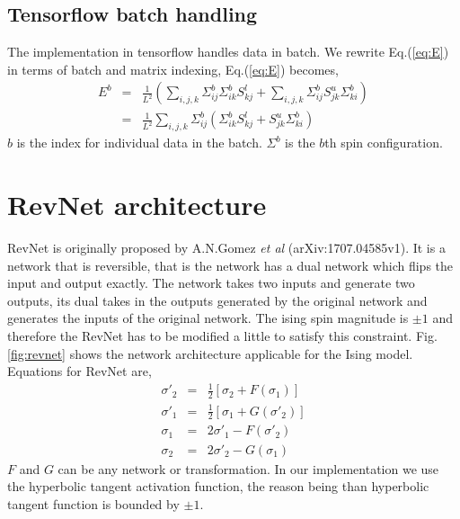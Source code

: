\documentclass{article}
\begin{document}
\subsection{Tensorflow batch handling}
The implementation in tensorflow handles data in batch. We rewrite 
Eq.(\ref{eq:E}) in terms
of batch and matrix indexing, Eq.(\ref{eq:E}) becomes,
\begin{eqnarray} \nonumber
E^b & = & \frac{1}{L^2} \left( 
             \sum_{i,j,k} \Sigma^b_{ij} \Sigma^b_{ik} S^l_{kj} +
             \sum_{i,j,k} \Sigma^b_{ij} S^u_{jk} \Sigma^b_{ki} 
          \right) \\
    & = & \frac{1}{L^2} \sum_{i,j,k} \Sigma^b_{ij}\left( 
              \Sigma^b_{ik} S^l_{kj} + S^u_{jk} \Sigma^b_{ki} 
          \right) 
\end{eqnarray}
$b$ is the index for individual data in the batch. $\Sigma^b$ is the $b$th
spin configuration.

\section{RevNet architecture}
RevNet is originally proposed by A.N.Gomez {\it et al} (arXiv:1707.04585v1).
It is a network that is reversible, that is the network has a dual network
which flips the input and output exactly. The network takes two inputs and
generate two outputs, its dual takes in the outputs generated by the original 
network and generates the inputs of the original network.
The ising spin magnitude is $\pm 1$ and therefore the RevNet has to be
modified a little to satisfy this constraint. Fig. \ref{fig:revnet} shows 
the network architecture applicable for the Ising model.
%
%
Equations for RevNet are,
\begin{eqnarray} 
\sigma'_2 & = & \frac{1}{2}[ \sigma_2 + F(\sigma_1) ] \\ \nonumber
\sigma'_1 & = & \frac{1}{2}[ \sigma_1 + G(\sigma'_2) ] \\ \nonumber
\sigma_1 & = & 2 \sigma'_1 - F(\sigma'_2) \\ \nonumber
\sigma_2 & = & 2 \sigma'_2 - G(\sigma_1) 
\end{eqnarray}
$F$ and $G$ can be any network or transformation. In our implementation
we use the hyperbolic tangent activation function, the reason being than
hyperbolic tangent function is bounded by $\pm 1$. 
\end{document}
